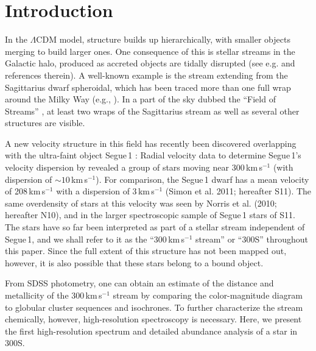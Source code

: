 \documentclass{emulateapj}
\begin{document}



\section{Introduction}
\label{sec:intro}
 

In the $\Lambda$CDM model, structure builds up hierarchically, with
smaller objects merging to build larger ones. One consequence of this
is stellar streams in the Galactic halo, produced as accreted objects
are tidally disrupted (see e.g. \citealt{Lynden-Bell1995} and
references therein). A well-known example is the stream extending from
the Sagittarius dwarf spheroidal, which has been traced more than one
full wrap around the Milky Way (e.g., \citealt{Ibata1994,
  Majewski2003}). In a part of the sky dubbed the ``Field of Streams''
\citep{Belokurov2006b}, at least two wraps of the Sagittarius stream
as well as several other structures are visible.

A new velocity structure in this field has recently been discovered
overlapping with the ultra-faint object Segue\,1
\citep{Belokurov2007}: Radial velocity data to determine Segue\,1's
velocity dispersion by \citet{Geha2009} revealed a group of stars
moving near 300\,km\,s$^{-1}$ (with dispersion of
$\sim10$\,km\,s$^{-1}$). For comparison, the Segue\,1 dwarf has a mean
velocity of 208\,km\,s$^{-1}$ with a dispersion of 3\,km\,s$^{-1}$
(Simon et al. 2011; hereafter S11)\nocite{Simon2011}.  The same
overdensity of stars at this velocity was seen by Norris et al. (2010;
hereafter N10)\nocite{Norris2010a}, and in the larger spectroscopic
sample of Segue\,1 stars of S11. The stars have so far been
interpreted as part of a stellar stream independent of Segue\,1, and
we shall refer to it as the ``300\,km\,s$^{-1}$ stream'' or ``300S''
throughout this paper. Since the full extent of this structure has not
been mapped out, however, it is also possible that these stars belong
to a bound object.

From SDSS photometry, one can obtain an estimate of the distance and
metallicity of the 300\,km\,s$^{-1}$ stream by comparing the
color-magnitude diagram to globular cluster sequences and
isochrones. To further characterize the stream chemically, however,
high-resolution spectroscopy is necessary. Here, we present the first
high-resolution spectrum and detailed abundance analysis of a star in
300S.
\end{document}

